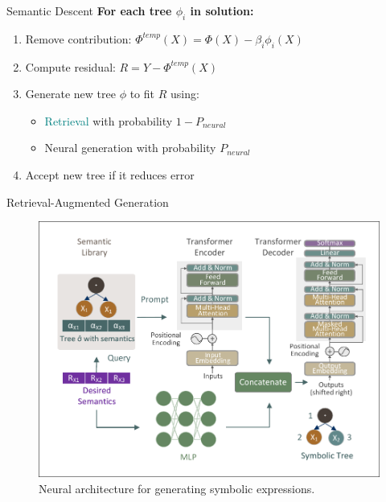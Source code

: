 \documentclass[final]{beamer}
\newcommand{\hlblue}[1]{\textcolor{mainblue}{#1}}
\newcommand{\hlpurple}[1]{\textcolor{accent}{#1}}
\newcommand{\hlteal}[1]{\textcolor{teal}{#1}}
\newlength{\onecolwid}
\begin{document}
\begin{frame}[t]
\begin{columns}[t]
\begin{column}{\onecolwid}
                \begin{block}{Semantic Descent}
                    \textbf{\hlblue{For each tree $\phi_i$ in solution:}}
                    \begin{enumerate}
                        \item Remove contribution: $\Phi^{temp}(X) = \Phi(X) - \beta_i \phi_i(X)$
                        \item Compute residual: $R = Y - \Phi^{temp}(X)$
                        \item Generate new tree $\phi$ to fit $R$ using:
                        \begin{itemize}
                            \item \hlteal{Retrieval} with probability $1-P_{neural}$
                            \item \hlpurple{Neural generation} with probability $P_{neural}$
                        \end{itemize}
                        \item Accept new tree if it reduces error
                    \end{enumerate}
                \end{block}


                \begin{block}{Retrieval-Augmented Generation}
                    \begin{figure}
                        \centering
                        \includegraphics[width=\linewidth, trim=25 20 15 10, clip]{figs/Transformer.pdf}
                        \caption{Neural architecture for generating symbolic expressions.}
                    \end{figure}


\end{block}
\end{column}
\end{columns}
\end{frame}
\end{document}

